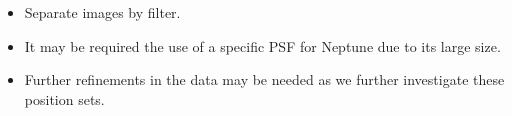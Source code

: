 \documentclass[12pt,a4paper]{report}
\newcommand{\PE}{Perkin-Elmer }
\newcommand{\BC}{Boller \& Chivens }
\begin{document}
\begin{itemize}
\item Separate images by filter.
\item It may be required the use of a specific PSF for Neptune due to its large size.
\item Further refinements in the data may be needed as we further investigate these position sets.
\end{itemize}


\end{document}
